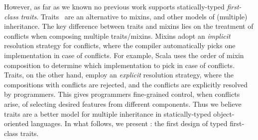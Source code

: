 However, as far as we known no previous work supports statically-typed
\emph{first-class traits}. Traits~\citep{scharli2003traits, Ducasse_2006} are an
alternative to mixins, and other models of (multiple) inheritance. The key
difference between traits and mixins lies on the treatment of conflicts when
composing multiple traits/mixins. Mixins adopt an \emph{implicit} resolution
strategy for conflicts, where the compiler automatically picks one
implementation in case of conflicts. For example, Scala uses the order of mixin
composition to determine which implementation to pick in case of conflicts.
Traits, on the other hand, employ an \emph{explicit} resolution strategy, where
the compositions with conflicts are rejected, and the conflicts are explicitly
resolved by programmers. This gives programmers fine-grained control, when
conflicts arise, of selecting desired features from different components. Thus
we believe traits are a better model for multiple inheritance in
statically-typed object-oriented languages. In what follows, we present \sedel:
the first design of typed first-class traits.






% 
% 


